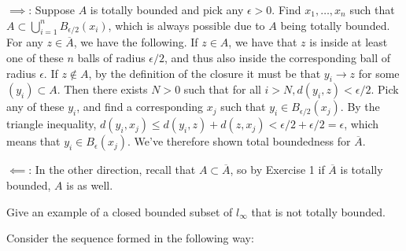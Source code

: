 \begin{solution}
    
   $\implies$: Suppose $A$ is totally bounded and pick any $\epsilon > 0$.
   Find $x_1, \ldots, x_n$ such that $A \subset \bigcup_{i=1}^{n} B_{\epsilon/2} (x_i)$, which is always possible due to $A$ being totally bounded.
   For any $z \in \overline{A}$, we have the following.
   If $z \in A$, we have that $z$ is inside at least one of these $n$ balls of radius $\epsilon/2$, and thus also inside the corresponding ball of radius $\epsilon$.
   If $z \notin A$, by the definition of the closure it must be that $y_i \rightarrow z$ for some $(y_i) \subset A$.
   Then there exists $N > 0$ such that for all $i > N, d(y_i, z) < \epsilon/2$.
   Pick any of these $y_i$, and find a corresponding $x_j$ such that $y_i \in B_{\epsilon/2}(x_j)$.
   By the triangle inequality, $d(y_i, x_j) \leq d(y_i, z) + d(z, x_j) < \epsilon/2 + \epsilon/2 = \epsilon$, which means that $y_i \in B_{\epsilon}(x_j)$.
   We've therefore shown total boundedness for $\overline{A}$.

   $\impliedby$: In the other direction, recall that $A \subset \overline{A}$, so by Exercise 1 if $\overline{A}$ is totally bounded, $A$ is as well.
\end{solution}

\begin{exercise}{9}
    Give an example of a closed bounded subset of $l_{\infty}$ that is not totally bounded.
\end{exercise}

\begin{solution}
    
    Consider the sequence formed in the following way:


\end{solution}
